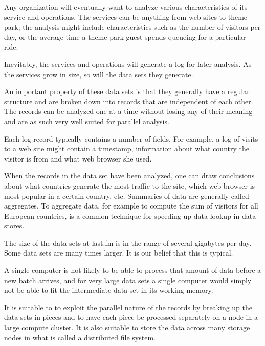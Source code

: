 
Any organization will eventually want to analyze various characteristics of
its service and operations. The services can be anything from web sites to
theme park; the analysis might include characteristics such as the number of
visitors per day, or the average time a theme park guest spends queueing for a
particular ride.

Inevitably, the services and operations will generate a log for later
analysis. As the services grow in size, so will the data sets they generate.

An important property of these data sets is that they generally have a regular
structure and are broken down into records that are independent of each other.
The records can be analyzed one at a time without losing any of their meaning
and are as such very well suited for parallel analysis.

Each log record typically contains a number of fields. For example, a log of
visits to a web site might contain a timestamp, information about what country
the visitor is from and what web browser she used.

When the records in the data set have been analyzed, one can draw conclusions
about what countries generate the most traffic to the site, which web browser
is most popular in a certain country, etc. Summaries of data are generally
called aggregates. To aggregate data, for example to compute the sum of
visitors for all European countries, is a common technique for speeding up
data lookup in data stores.

The size of the data sets at last.fm is in the range of several gigabytes per
day. Some data sets are many times larger. It is our belief that this is
typical.

A single computer is not likely to be able to process that amount of data
before a new batch arrives, and for very large data sets a single computer
would simply not be able to fit the intermediate data set in its working
memory.

It is suitable to to exploit the parallel nature of the records by breaking up
the data sets in pieces and to have each piece be processed separately on a
node in a large compute cluster. It is also suitable to store the data across
many storage nodes in what is called a distributed file system.




